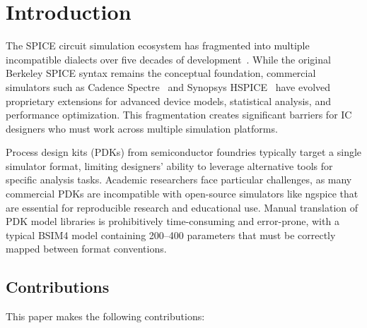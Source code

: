 \documentclass[conference]{IEEEtran}
\begin{document}
\section{Introduction}

The SPICE circuit simulation ecosystem has fragmented into multiple incompatible dialects over five decades of development~\cite{ngspice}. While the original Berkeley SPICE syntax remains the conceptual foundation, commercial simulators such as Cadence Spectre~\cite{spectre} and Synopsys HSPICE~\cite{hspice} have evolved proprietary extensions for advanced device models, statistical analysis, and performance optimization. This fragmentation creates significant barriers for IC designers who must work across multiple simulation platforms.

Process design kits (PDKs) from semiconductor foundries typically target a single simulator format, limiting designers' ability to leverage alternative tools for specific analysis tasks. Academic researchers face particular challenges, as many commercial PDKs are incompatible with open-source simulators like ngspice that are essential for reproducible research and educational use. Manual translation of PDK model libraries is prohibitively time-consuming and error-prone, with a typical BSIM4 model containing 200--400 parameters that must be correctly mapped between format conventions.

\subsection{Contributions}

This paper makes the following contributions:
\end{document}
